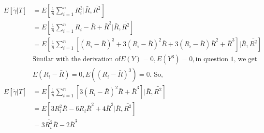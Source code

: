 \documentclass[11pt]{article}
\begin{document}
\begin{align*}
E[\tilde{\gamma}|T] & = E[\frac{1}{n} \sum_{i=1}^{n} R_{i}^{3} | \bar R, \bar {R^2}]\\
&= E[\frac{1}{n} \sum_{i=1}^{n} {R_{i}-\bar R +\bar R}^{3} | \bar R, \bar {R^2}]\\
&= E[\frac{1}{n} \sum_{i=1}^{n} [(R_i - \bar R)^3+3(R_i - \bar R)^2\bar R + 3(R_i - \bar R){\bar R}^2 +{\bar R}^3] | \bar R, \bar {R^2}]\\
&\text{Similar with the derivation of} E(Y) = 0, E(Y^3) = 0, \text{in question 1, we get} \\
&	E(R_i - \bar R) = 0, E((R_i - \bar R)^3) = 0. \text{ So,}\\
E[\tilde{\gamma}|T] & =E[\frac{1}{n} \sum_{i=1}^{n} [3(R_i - \bar R)^2\bar R +{\bar R}^3] | \bar R, \bar {R^2}]\\
&= E[3R_i^2\bar R -6R_i{\bar R}^2 +4{\bar R}^3| \bar R, \bar {R^2}]\\
&=3\bar{R_i^2}\bar R -2{\bar R}^3
\end{align*}
\end{document}
